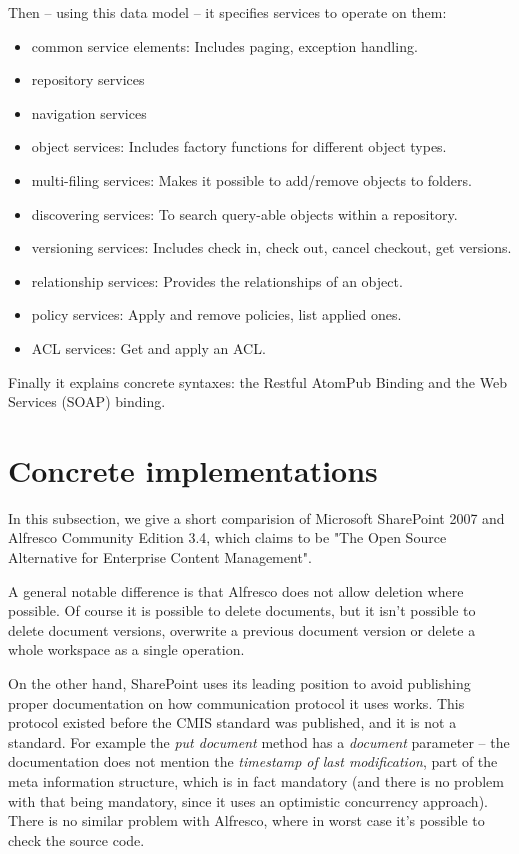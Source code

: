 Then -- using this data model -- it specifies services to operate on them:

\begin{itemize}
\item common service elements: Includes paging, exception handling.
\item repository services
\item navigation services
\item object services: Includes factory functions for different object types.
\item multi-filing services: Makes it possible to add/remove objects to folders.
\item discovering services: To search query-able objects within a repository.
\item versioning services: Includes check in, check out, cancel checkout, get
	versions.
\item relationship services: Provides the relationships of an object.
\item policy services: Apply and remove policies, list applied ones.
\item ACL services: Get and apply an ACL.
\end{itemize}

Finally it explains concrete syntaxes: the Restful AtomPub Binding and the Web
Services (SOAP) binding.

\section{Concrete implementations}

In this subsection, we give a short comparision of Microsoft SharePoint 2007 and
Alfresco Community Edition 3.4, which claims to be "The Open Source Alternative
for Enterprise Content Management".

A general notable difference is that Alfresco does not allow deletion where
possible. Of course it is possible to delete documents, but it isn't possible
to delete document versions, overwrite a previous document version or delete a
whole workspace as a single operation.

On the other hand, SharePoint uses its leading position to avoid publishing
proper documentation on how communication protocol it uses works. This protocol
existed before the CMIS standard was published, and it is not a standard. For
example the \emph{put document} method has a \emph{document} parameter -- the
documentation\cite{spdoc} does not mention the \emph{timestamp of last
modification}, part of the meta information structure, which is in fact
mandatory (and there is no problem with that being mandatory, since it uses an
optimistic concurrency approach). There is no similar problem with Alfresco,
where in worst case it's possible to check the source code.

